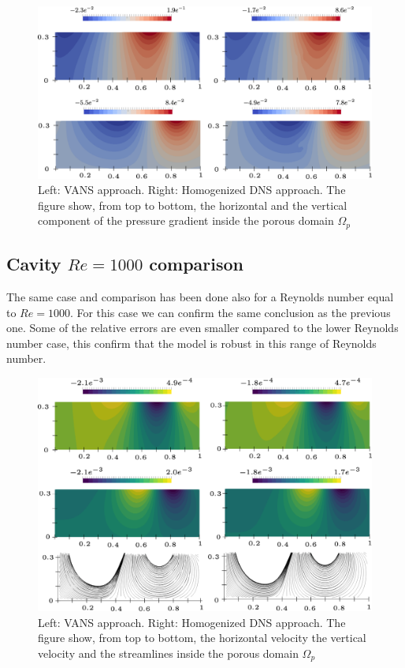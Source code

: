 \begin{figure}[h]
	\centering
	\includegraphics[width=1\linewidth]{chapter_5/figure/re100/vans_p}
	\caption{Left: VANS approach. Right: Homogenized DNS approach. The figure show, from top to bottom, the horizontal and the vertical component of the pressure gradient inside the porous domain $\Omega_p$}
	\label{fig:100_p}
\end{figure}


\subsection{Cavity $Re=1000$ comparison}

The same case and comparison has been done also for a Reynolds number equal to $Re=1000$.
For this case we can confirm the same conclusion as the previous one. Some of the relative errors are even smaller compared to the lower Reynolds number case, this confirm that the model is robust in this range of Reynolds number.

\begin{figure}[h]
	\centering
	\includegraphics[width=1\linewidth]{chapter_5/figure/re1000/vans_u}
	\caption{Left: VANS approach. Right: Homogenized DNS approach. The figure show, from top to bottom, the horizontal velocity the vertical velocity and the streamlines inside the porous domain $\Omega_p$}
	\label{fig:1000_u}
\end{figure}

